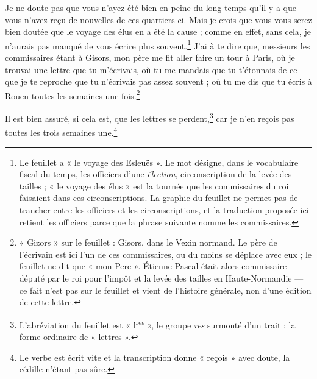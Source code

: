 \documentclass[11pt,a4paper]{article}
\begin{document}
Je ne doute pas que vous n'ayez été bien en peine du long temps qu'il y a que
vous n'avez reçu de nouvelles de ces quartiers-ci. Mais je crois que vous vous
serez bien doutée que le voyage des élus en a été la cause ; comme en effet,
sans cela, je n'aurais pas manqué de vous écrire plus souvent.\footnote{Le
feuillet a « le voyage des Esleuës ». Le mot désigne, dans le vocabulaire
fiscal du temps, les officiers d'une \emph{élection}, circonscription de la
levée des tailles ; « le voyage des élus » est la tournée que les commissaires
du roi faisaient dans ces circonscriptions. La graphie du feuillet ne permet
pas de trancher entre les officiers et les circonscriptions, et la traduction
proposée ici retient les officiers parce que la phrase suivante nomme les
commissaires.} J'ai à te dire que, messieurs les commissaires étant à Gisors,
mon père me fit aller faire un tour à Paris, où je trouvai une lettre que tu
m'écrivais, où tu me mandais que tu t'étonnais de ce que je te reproche que tu
n'écrivais pas assez souvent ; où tu me dis que tu écris à Rouen toutes les
semaines une fois.\footnote{« Gizors » sur le feuillet : Gisors, dans le Vexin
normand. Le père de l'écrivain est ici l'un de ces commissaires, ou du moins
se déplace avec eux ; le feuillet ne dit que « mon Pere ». Étienne Pascal
était alors commissaire député par le roi pour l'impôt et la levée des tailles
en Haute-Normandie — ce fait n'est pas sur le feuillet et vient de l'histoire
générale, non d'une édition de cette lettre.}

Il est bien assuré, si cela est, que les lettres se
perdent,\footnote{L'abréviation du feuillet est « l\textsuperscript{res} », le
groupe \emph{res} surmonté d'un trait : la forme ordinaire de « lettres ».}
car je n'en reçois pas toutes les trois semaines une.\footnote{Le verbe est
écrit vite et la transcription donne « reçois » avec doute, la cédille n'étant
pas sûre.}
\end{document}
